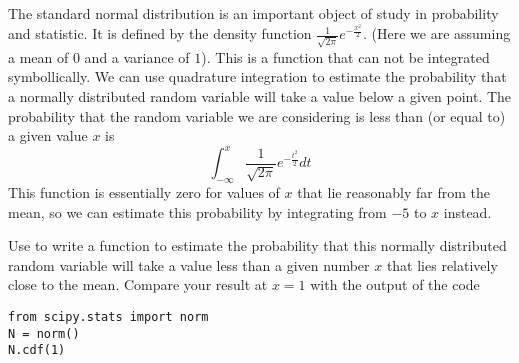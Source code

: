 \begin{problem}
The standard normal distribution is an important object of study in probability and statistic.
It is defined by the density function $\frac{1}{\sqrt{2 \pi}} e^{- \frac{x^2}{2}}$.
(Here we are assuming a mean of $0$ and a variance of $1$).
This is a function that can not be integrated symbollically.
We can use quadrature integration to estimate the probability that a normally distributed random variable will take a value below a given point.
The probability that the random variable we are considering is less than (or equal to) a given value $x$ is
\[\int_{-\infty}^x \frac{1}{\sqrt{2 \pi}} e^{- \frac{t^2}{2}} dt\]
This function is essentially zero for values of $x$ that lie reasonably far from the mean, so we can estimate this probability by integrating from $-5$ to $x$ instead.

Use  to write a function to estimate the probability that this normally distributed random variable will take a value less than a given number $x$ that lies relatively close to the mean.
Compare your result at $x = 1$ with the output of the code
\begin{lstlisting}
from scipy.stats import norm
N = norm()
N.cdf(1)
\end{lstlisting}
\end{problem}
